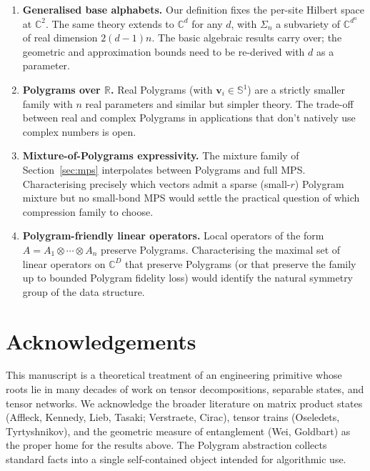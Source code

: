 \documentclass[11pt,letterpaper]{article}
\theoremstyle{definition}
\newcommand{\C}{\mathbb{C}}
\newcommand{\R}{\mathbb{R}}
\newcommand{\Sphere}{\mathbb{S}}
\begin{document}
\begin{enumerate}[leftmargin=*, itemsep=4pt]
\item \textbf{Generalised base alphabets.} Our definition fixes the per-site
      Hilbert space at $\C^{2}$. The same theory extends to $\C^{d}$ for
      any $d$, with $\Sigma_{n}$ a subvariety of $\C^{d^{n}}$ of real
      dimension $2(d-1) n$. The basic algebraic results carry over; the
      geometric and approximation bounds need to be re-derived with $d$ as
      a parameter.

\item \textbf{Polygrams over $\R$.} Real Polygrams (with $\bm{v}_{i} \in
      \Sphere^{1}$) are a strictly smaller family with $n$ real parameters
      and similar but simpler theory. The trade-off between real and
      complex Polygrams in applications that don't natively use complex
      numbers is open.

\item \textbf{Mixture-of-Polygrams expressivity.} The mixture family of
      Section~\ref{sec:mps} interpolates between Polygrams and full MPS.
      Characterising precisely which vectors admit a sparse (small-$r$)
      Polygram mixture but no small-bond MPS would settle the
      practical question of which compression family to choose.

\item \textbf{Polygram-friendly linear operators.} Local operators of the
      form $A = A_{1} \otimes \cdots \otimes A_{n}$ preserve Polygrams.
      Characterising the maximal set of linear operators on $\C^{D}$ that
      preserve Polygrams (or that preserve the family up to bounded
      Polygram fidelity loss) would identify the natural symmetry group
      of the data structure.
\end{enumerate}

\section*{Acknowledgements}

This manuscript is a theoretical treatment of an engineering primitive whose
roots lie in many decades of work on tensor decompositions, separable states,
and tensor networks. We acknowledge the broader literature on matrix product
states (Affleck, Kennedy, Lieb, Tasaki; Verstraete, Cirac), tensor trains
(Oseledets, Tyrtyshnikov), and the geometric measure of entanglement
(Wei, Goldbart) as the proper home for the results above. The Polygram
abstraction collects standard facts into a single self-contained object
intended for algorithmic use.
\end{document}
